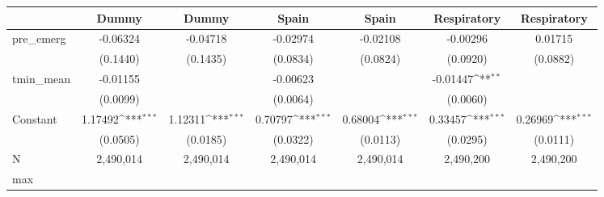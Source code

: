 {
\def\sym#1{\ifmmode^{#1}\else\(^{#1}\)\fi}
\begin{tabular}{l*{6}{c}}
\toprule
            &\multicolumn{1}{c}{Dummy}&\multicolumn{1}{c}{Dummy}&\multicolumn{1}{c}{Spain}&\multicolumn{1}{c}{Spain}&\multicolumn{1}{c}{Respiratory}&\multicolumn{1}{c}{Respiratory}\\
\midrule
pre\_emerg   &    -0.06324         &    -0.04718         &    -0.02974         &    -0.02108         &    -0.00296         &     0.01715         \\
            &    (0.1440)         &    (0.1435)         &    (0.0834)         &    (0.0824)         &    (0.0920)         &    (0.0882)         \\
tmin\_mean   &    -0.01155         &                     &    -0.00623         &                     &    -0.01447\sym{**} &                     \\
            &    (0.0099)         &                     &    (0.0064)         &                     &    (0.0060)         &                     \\
Constant    &     1.17492\sym{***}&     1.12311\sym{***}&     0.70797\sym{***}&     0.68004\sym{***}&     0.33457\sym{***}&     0.26969\sym{***}\\
            &    (0.0505)         &    (0.0185)         &    (0.0322)         &    (0.0113)         &    (0.0295)         &    (0.0111)         \\
\midrule
N           &   2,490,014         &   2,490,014         &   2,490,014         &   2,490,014         &   2,490,200         &   2,490,200         \\
max         &                     &                     &                     &                     &                     &                     \\
\bottomrule
\end{tabular}
}
